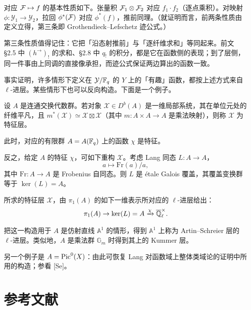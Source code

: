 对应 $\mathcal{F}\mapsto f$ 的基本性质如下。张量积 $\mathcal{F}_1\otimes\mathcal{F}_2$ 对应 $f_1\cdot f_2$（逐点乘积）。对映射 $\phi:\mathcal{Y}_1\to\mathcal{Y}_2$，拉回 $\phi^*(\mathcal{F})$ 对应 $\phi^*(f)$，推前同理。（就证明而言，前两条性质由定义立得，第三条即 Grothendieck--Lefschetz 迹公式。）

\begin{annote}
第三条性质值得记住：它把「沿态射推前」与「逐纤维求和」等同起来。前文 \S2.5 中 $(h^{\rightarrow})_!$ 的求和、\S2.8 中 $q_!$ 的积分，都是它在函数侧的表现；到了层侧，同一件事由上同调的直接像承担，而迹公式保证两边算出的函数一致。\par\vspace{0.15em}{\raggedleft 【来源：原书 \S4.2（A）；Grothendieck--Lefschetz 迹公式的标准表述（B）】\par}
\end{annote}

事实证明，许多情形下定义在 $\mathcal{Y}/\mathbb{F}_q$ 的 $Y$ 上的「有趣」函数，都按上述方式来自 $\ell$-进层。某些情形下也可以反向构造。下面是一个例子。

设 $A$ 是连通交换代数群。若对象 $\mathcal{X}\in D^b(A)$ 是一维局部系统，其在单位元处的纤维平凡，且 $m^*(\mathcal{X})\simeq\mathcal{X}\boxtimes\mathcal{X}$（其中 $m:A\times A\to A$ 是乘法映射），则称 $\mathcal{X}$ 为特征层。

此时，对应的有限群 $A=A(\mathbb{F}_q)$ 上的函数 $\chi$ 是特征。

反之，给定 $A$ 的特征 $\chi$，可如下重构 $\mathcal{X}$。考虑 Lang 同态 $L:A\to A$，
\[
a\mapsto\mathrm{Fr}(a)/a,
\]
其中 $\mathrm{Fr}:A\to A$ 是 Frobenius 自同态。则 $L$ 是 \'etale Galois 覆盖，其覆盖变换群等于 $\ker(L)=A$。

所求的特征层 $\mathcal{X}$，由 $\pi_1(A)$ 的如下一维表示所对应的 $\ell$-进层给出：
\[
\pi_1(A)\to\ker(L)=A\xrightarrow{\chi}\overline{\mathbb{Q}}_\ell^\times .
\]

把这一构造用于 $A$ 是仿射直线 $\mathbb{A}^1$ 的情形，得到 $\mathbb{A}^1$ 上称为 Artin--Schreier 层的 $\ell$-进层。类似地，$A$ 是乘法群 $\mathbb{G}_m$ 时得到其上的 Kummer 层。

另一个例子是 $A=\operatorname{Pic}^0(X)$：由此可恢复 Lang 对函数域上整体类域论的证明中所用的构造；参看 [Se]。

\par\bigskip
\section*{参考文献}

